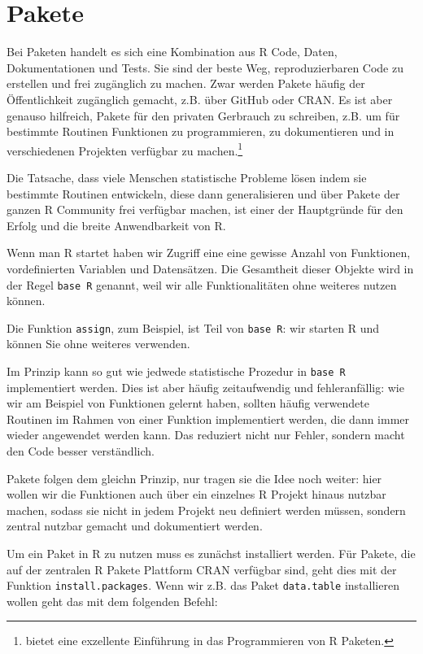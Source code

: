 \documentclass[]{tufte-book}
\begin{document}
\section{Pakete}\label{pakete}

Bei Paketen handelt es sich eine Kombination aus R Code, Daten,
Dokumentationen und Tests. Sie sind der beste Weg, reproduzierbaren Code
zu erstellen und frei zugänglich zu machen. Zwar werden Pakete häufig
der Öffentlichkeit zugänglich gemacht, z.B. über GitHub oder CRAN. Es
ist aber genauso hilfreich, Pakete für den privaten Gerbrauch zu
schreiben, z.B. um für bestimmte Routinen Funktionen zu programmieren,
zu dokumentieren und in verschiedenen Projekten verfügbar zu
machen.\footnote{\citet{Packages} bietet eine exzellente Einführung in
  das Programmieren von R Paketen.}

Die Tatsache, dass viele Menschen statistische Probleme lösen indem sie
bestimmte Routinen entwickeln, diese dann generalisieren und über Pakete
der ganzen R Community frei verfügbar machen, ist einer der Hauptgründe
für den Erfolg und die breite Anwendbarkeit von R.

Wenn man R startet haben wir Zugriff eine eine gewisse Anzahl von
Funktionen, vordefinierten Variablen und Datensätzen. Die Gesamtheit
dieser Objekte wird in der Regel \texttt{base\ R} genannt, weil wir alle
Funktionalitäten ohne weiteres nutzen können.

Die Funktion \texttt{assign}, zum Beispiel, ist Teil von
\texttt{base\ R}: wir starten R und können Sie ohne weiteres verwenden.

Im Prinzip kann so gut wie jedwede statistische Prozedur in
\texttt{base\ R} implementiert werden. Dies ist aber häufig
zeitaufwendig und fehleranfällig: wie wir am Beispiel von Funktionen
gelernt haben, sollten häufig verwendete Routinen im Rahmen von einer
Funktion implementiert werden, die dann immer wieder angewendet werden
kann. Das reduziert nicht nur Fehler, sondern macht den Code besser
verständlich.

Pakete folgen dem gleichn Prinzip, nur tragen sie die Idee noch weiter:
hier wollen wir die Funktionen auch über ein einzelnes R Projekt hinaus
nutzbar machen, sodass sie nicht in jedem Projekt neu definiert werden
müssen, sondern zentral nutzbar gemacht und dokumentiert werden.

Um ein Paket in R zu nutzen muss es zunächst installiert werden. Für
Pakete, die auf der zentralen R Pakete Plattform CRAN verfügbar sind,
geht dies mit der Funktion \texttt{install.packages}. Wenn wir z.B. das
Paket \texttt{data.table} installieren wollen geht das mit dem folgenden
Befehl:
\end{document}
